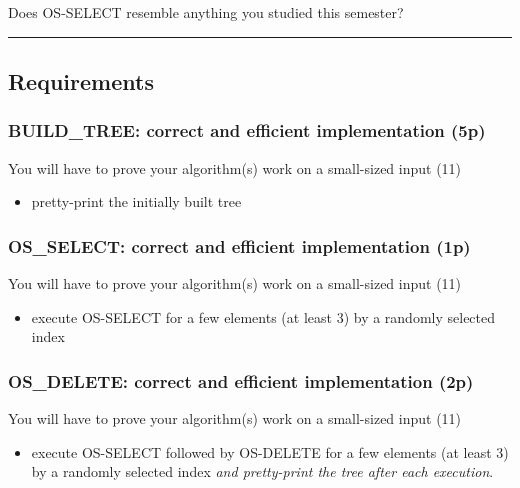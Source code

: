 \documentclass[../en-fa-lab.tex]{subfiles}
\begin{document}
Does OS-SELECT resemble anything you studied this semester?

\begin{center}\rule{0.5\linewidth}{0.5pt}\end{center}

\subsection{Requirements}\label{requirements}

\subsubsection{BUILD\_TREE: correct and efficient implementation
(5p)}\label{build_tree-correct-and-efficient-implementation-5p}

You will have to prove your algorithm(s) work on a small-sized input
(11)

\begin{itemize}
\item
  pretty-print the initially built tree
\end{itemize}

\subsubsection{OS\_SELECT: correct and efficient implementation
(1p)}\label{os_select-correct-and-efficient-implementation-1p}

You will have to prove your algorithm(s) work on a small-sized input
(11)

\begin{itemize}
\item
  execute OS-SELECT for a few elements (at least 3) by a randomly
  selected index
\end{itemize}

\subsubsection{OS\_DELETE: correct and efficient implementation
(2p)}\label{os_delete-correct-and-efficient-implementation-2p}

You will have to prove your algorithm(s) work on a small-sized input
(11)

\begin{itemize}
\item
  execute OS-SELECT followed by OS-DELETE for a few elements (at least
  3) by a randomly selected index \emph{and pretty-print the tree after
  each execution}.
\end{itemize}
\end{document}
